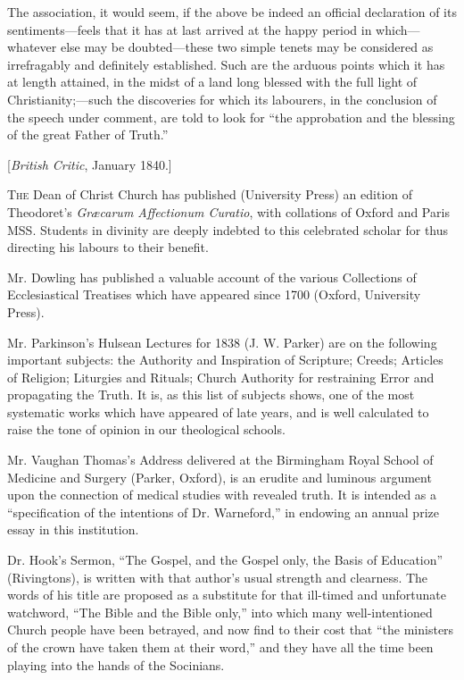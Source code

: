 The association, it would seem, if the above be
indeed an official declaration of its sentiments—feels that it has at
last arrived at the happy period in which—whatever else may be
doubted—these two simple tenets may be considered as irrefragably and
definitely established. Such are the arduous points which it has at
length attained, in the midst of a land long blessed with the full light
of Christianity;—such the discoveries for which its labourers, in the
conclusion of the speech under comment, are told to look for ``the
approbation and the blessing of the great Father of Truth.''


[\emph{British Critic}, January 1840.]

T\textsc{he} Dean of Christ
Church has published (University Press) an edition of Theodoret's \emph{Græcarum
Affectionum Curatio}, with collations of Oxford and Paris MSS.
Students in divinity are deeply indebted to this celebrated scholar for
thus directing his labours to their benefit.

Mr. Dowling has published a valuable account of the
various Collections of Ecclesiastical Treatises which have appeared
since 1700 (Oxford, University Press).

Mr. Parkinson's Hulsean Lectures for 1838 (J. W.
Parker) are on the following important subjects: the Authority and
Inspiration of Scripture; Creeds; Articles of Religion; Liturgies and
Rituals; Church Authority for restraining Error and propagating the
Truth. It is, as this list of subjects shows, one of the most systematic
works which have appeared of late years, and is well calculated to raise
the tone of opinion in our theological schools.

Mr. Vaughan Thomas's Address delivered at the
Birmingham Royal School of Medicine and Surgery (Parker, Oxford), is an
erudite and luminous argument upon the connection of medical studies
with revealed truth. It is intended as a ``specification of the
intentions of Dr. Warneford,'' in endowing an annual prize essay in this
institution.

Dr. Hook's Sermon, ``The Gospel, and the Gospel
only, the Basis of Education'' (Rivingtons), is written with that author's
usual strength and clearness. The words of his title are proposed as a
substitute for that ill-timed and unfortunate watchword, ``The Bible and
the Bible only,'' into which many well-intentioned Church people have
been betrayed, and now find to their cost that ``the ministers of the
crown have taken them at their word,'' and they have all the time been
playing into the hands of the Socinians.

